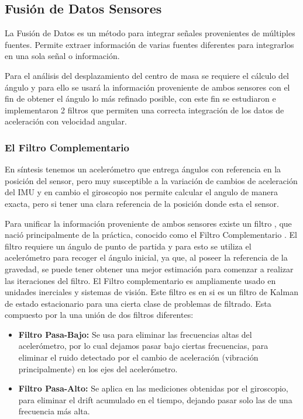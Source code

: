 \documentclass[12pt,a4paper]{article}
\begin{document}
			\subsection{Fusión de Datos Sensores}
			La Fusión de Datos es un método para integrar señales provenientes de múltiples fuentes. Permite extraer información de varias fuentes diferentes para integrarlos en una sola señal o información.
			
			Para el análisis del desplazamiento del centro de masa se requiere el cálculo del ángulo y para ello se usará la información proveniente de ambos sensores con el fin de obtener el ángulo lo más refinado posible, con este fin se estudiaron e implementaron 2 filtros que permiten una correcta integración de los datos de aceleración con velocidad angular.
			
			\subsubsection{El Filtro Complementario}
			
			En síntesis tenemos un acelerómetro que entrega ángulos con referencia en la posición del sensor, pero muy susceptible a la variación de cambios de aceleración del IMU y en cambio el giroscopio nos permite calcular el angulo de manera exacta, pero si tener una clara referencia de la posición donde esta el sensor. 
			
			Para unificar la información proveniente de ambos sensores existe un filtro , que nació principalmente de la práctica, conocido como el Filtro Complementario \cite[Capítulo 3, p.~44]{TesisUSM}.
			El filtro requiere un ángulo de punto de partida y para esto se utiliza el acelerómetro para recoger el ángulo inicial, ya que, al poseer la referencia de la gravedad, se puede tener obtener una mejor estimación para comenzar a realizar las iteraciones del filtro.
			\newline
			El Filtro complementario es ampliamente usado en unidades inerciales y sistemas de visión. Este filtro es en si es un filtro de Kalman de estado estacionario para una cierta clase de problemas de filtrado.
			Esta compuesto por la una unión de dos filtros diferentes:
			\begin{itemize}
				\item \textbf{Filtro Pasa-Bajo:} Se usa para eliminar las frecuencias altas del acelerómetro, por lo cual dejamos pasar bajo ciertas frecuencias, para eliminar el ruido detectado por el cambio de aceleración (vibración principalmente) en los ejes del acelerómetro.
				\item \textbf{Filtro Pasa-Alto:} Se aplica en las mediciones obtenidas por el giroscopio, para eliminar el drift acumulado en el tiempo, dejando pasar solo las de una frecuencia más alta.
			\end{itemize}
			
\end{document}
